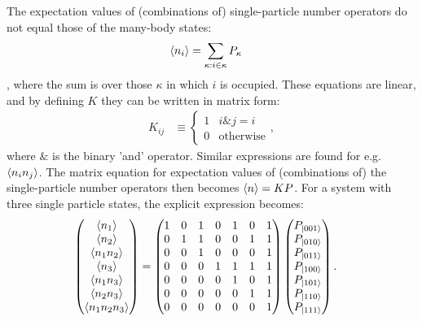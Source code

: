 The expectation values of (combinations of) single-particle number operators do not equal those of the many-body states:
\begin{align*}
\braket{n_i} &= \sum_{\kappa: i \in \kappa} P_\kappa
\end{align*}, where the sum is over those $\kappa$ in which $i$ is occupied. These equations are linear, and by defining $K$ they can be written in matrix form:
\begin{align*}
K_{ij} &\equiv \begin{cases} 1 & i \& j = i\\ 0 & \text{otherwise} \end{cases},
\end{align*} where $\&$ is the binary 'and' operator. Similar expressions are found for e.g. $\braket{n_i n_j}$. The matrix equation for expectation values of (combinations of) the single-particle number operators then becomes $\braket{n} = K P$. For a system with three single particle states, the explicit expression becomes:
\begin{align*}
\begin{pmatrix} \braket{n_1} \\\braket{n_2} \\ \braket{n_1 n_2} \\ \braket{n_3} \\ \braket{n_1 n_3} \\ \braket{n_2 n_3} \\ \braket{n_1 n_2 n_3} \end{pmatrix} &= \begin{pmatrix} 1 & 0 & 1 & 0 & 1 & 0 & 1 \\ 0  &  1  & 1 & 0  &  0  &  1  &  1\\ 0 & 0 & 1 & 0 & 0 & 0 & 1\\0 & 0 & 0 & 1 & 1 & 1 & 1 \\ 0  &  0  &  0  &  0  &  1  &  0  &  1 \\ 0  &  0  &  0  & 0 &  0  & 1 & 1\\0 & 0 & 0 & 0 & 0 & 0 & 1\end{pmatrix} \begin{pmatrix} P_{\ket{001}} \\ P_{\ket{010}} \\ P_{\ket{011}} \\ P_{\ket{100}} \\ P_{\ket{101}} \\ P_{\ket{110}} \\ P_{\ket{111}} \end{pmatrix}.
\end{align*}
